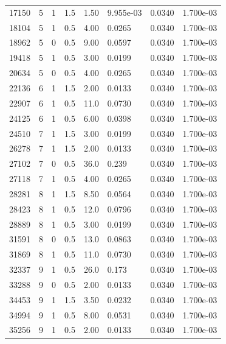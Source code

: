 \documentclass[preview]{standalone}
\begin{document}
{{\begin{tabular}{L{1.2cm}C{1.2cm} C{0.3cm}C{0.5cm} C{1.4cm}C{1.4cm} C{1.4cm}C{1.4cm}}
  17150  &     5  & 1     & 1.5 &  1.50  & 9.955e-03  & 0.0340 &  1.700e-03   \\ 
  18104  &     5  & 1     & 0.5 &  4.00  & 0.0265  & 0.0340 &  1.700e-03   \\ 
  18962  &     5  & 0     & 0.5 &  9.00  & 0.0597  & 0.0340 &  1.700e-03   \\ 
  19418  &     5  & 1     & 0.5 &  3.00  & 0.0199  & 0.0340 &  1.700e-03   \\ 
  20634  &     5  & 0     & 0.5 &  4.00  & 0.0265  & 0.0340 &  1.700e-03   \\ 
  22136  &     6  & 1     & 1.5 &  2.00  & 0.0133  & 0.0340 &  1.700e-03   \\ 
  22907  &     6  & 1     & 0.5 &  11.0  & 0.0730  & 0.0340 &  1.700e-03   \\ 
  24125  &     6  & 1     & 0.5 &  6.00  & 0.0398  & 0.0340 &  1.700e-03   \\ 
  24510  &     7  & 1     & 1.5 &  3.00  & 0.0199  & 0.0340 &  1.700e-03   \\ 
  26278  &     7  & 1     & 1.5 &  2.00  & 0.0133  & 0.0340 &  1.700e-03   \\ 
  27102  &     7  & 0     & 0.5 &  36.0  & 0.239  & 0.0340 &  1.700e-03   \\ 
  27118  &     7  & 1     & 0.5 &  4.00  & 0.0265  & 0.0340 &  1.700e-03   \\ 
  28281  &     8  & 1     & 1.5 &  8.50  & 0.0564  & 0.0340 &  1.700e-03   \\ 
  28423  &     8  & 1     & 0.5 &  12.0  & 0.0796  & 0.0340 &  1.700e-03   \\ 
  28889  &     8  & 1     & 0.5 &  3.00  & 0.0199  & 0.0340 &  1.700e-03   \\ 
  31591  &     8  & 0     & 0.5 &  13.0  & 0.0863  & 0.0340 &  1.700e-03   \\ 
  31869  &     8  & 1     & 0.5 &  11.0  & 0.0730  & 0.0340 &  1.700e-03   \\ 
  32337  &     9  & 1     & 0.5 &  26.0  & 0.173  & 0.0340 &  1.700e-03   \\ 
  33288  &     9  & 0     & 0.5 &  2.00  & 0.0133  & 0.0340 &  1.700e-03   \\ 
  34453  &     9  & 1     & 1.5 &  3.50  & 0.0232  & 0.0340 &  1.700e-03   \\ 
  34994  &     9  & 1     & 0.5 &  8.00  & 0.0531  & 0.0340 &  1.700e-03   \\ 
  35256  &     9  & 1     & 0.5 &  2.00  & 0.0133  & 0.0340 &  1.700e-03   \\ 

\end{tabular}}}
\end{document}
